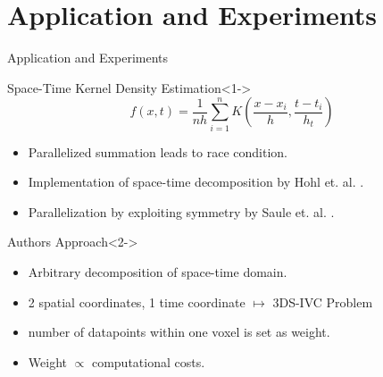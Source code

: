 \section{Application and Experiments}

\begin{frame}[fragile, t]{Application and Experiments}
  \begin{block}{Space-Time Kernel Density Estimation}<1->
    \[ f(x, t) = \frac{1}{nh} \sum_{i=1}^{n} K\left(\frac{x - x_i}{h}, \frac{t - t_i}{h_t}\right) \]
    \begin{itemize}
      \item Parallelized summation leads to race condition.
      \item Implementation of space-time decomposition by Hohl et. al. \cite{kernel_estimation_1}.
      \item Parallelization by exploiting symmetry by Saule et. al. \cite{kernel_estimation_2}.
    \end{itemize}
  \end{block}

  \begin{block}{Authors Approach}<2->
    \begin{itemize}
      \item<3-> Arbitrary decomposition of space-time domain.
      \item<4-> 2 spatial coordinates, 1 time coordinate $\mapsto$ 3DS-IVC Problem
      \item<5-> number of datapoints within one voxel is set as weight.\footnotemark
      \item<5-> Weight $\propto$ computational costs.
    \end{itemize}
  \end{block}

  \vspace{0pt}
\end{frame}


